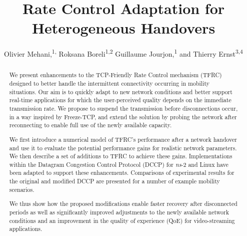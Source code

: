 \documentclass[twocolumn]{nictatechreport}
\newcommand{\theTitle}{Rate Control Adaptation for Heterogeneous Handovers}
\newcommand{\ns}{\textit{ns}}
\begin{document}
\title{\theTitle} 





\author{Olivier Mehani,\textsuperscript{1,} Roksana Boreli\textsuperscript{1,2} Guillaume Jourjon,\textsuperscript{1} and Thierry Ernst\textsuperscript{3,4}}   




\frontmatter \begin{abstract}

We present enhancements to the TCP-Friendly Rate Control mechanism (TFRC)
designed to better handle the intermittent connectivity occurring in mobility
situations. Our aim is to quickly adapt to new network conditions and better
support real-time applications for which the user-perceived quality depends on
the immediate transmission rate. We propose to suspend the transmission before
disconnections occur, in a way inspired by Freeze-TCP, and extend the solution by
probing the network after reconnecting to enable full use of the newly available
capacity.

We first introduce a numerical model of TFRC's performance after a network
handover and use it to evaluate the potential performance gains for realistic
network parameters.  We then describe a set of additions to TFRC to achieve
these gains.  Implementations within the Datagram Congestion Control Protocol
(DCCP) for \ns-2 and Linux have been adapted to support these enhancements.
Comparisons of experimental results for the original and modified DCCP are
presented for a number of example mobility scenarios.

We thus show how the proposed modifications enable faster recovery after
disconnected periods as well as significantly improved adjustments to the newly
available network conditions and an improvement in the quality of experience
(QoE) for video-streaming applications.

\end{abstract}
\end{document}
